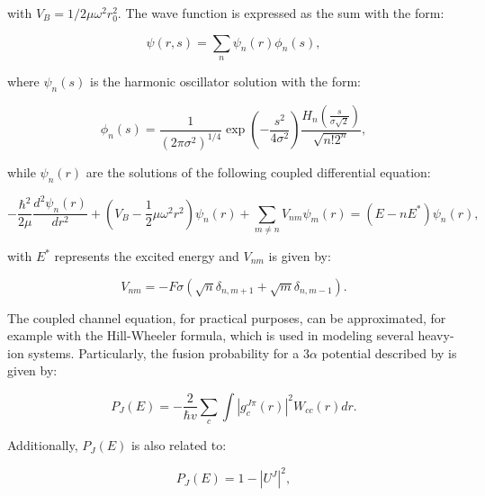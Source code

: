 \documentclass[openany]{book}
\begin{document}
with $V_B = 1/2\mu\omega^2r_0^2$. The wave function is expressed as the sum with the form: 

\begin{equation}\label{eq:potential_ZPM_waveFunction}
	\psi(r, s) = \sum_{n} {\psi_n(r)\phi_n(s)},
\end{equation}

where $\psi_n(s)$ is the harmonic oscillator solution with the form: 

\begin{equation}\label{eq:potential_ZPM_waveFunction_harmonicOscillator}
	\phi_n(s) = \frac{1}{(2\pi \sigma^2)^{1/4}} \exp {\left(-\frac{s^2}{4\sigma^2}\right)} \frac{H_n\left(\frac{s}{\sigma \sqrt 2 }\right)}{\sqrt{n!2^n}},
\end{equation}

while $\psi_n(r)$ are the solutions of the following coupled differential equation: 

\begin{equation}\label{eq:potential_ZPM_waveFunction_coupledDifferentialEquation}
	- \frac{\hbar^2}{2\mu} \frac{d^2\psi_n(r)}{dr^2} + \left(V_B - \frac{1}{2} \mu \omega^2 r^2 \right) \psi_n(r) + \sum_{m\neq n}{V_{nm}\psi_m(r)} = (E - nE^{*})\psi_n(r),
\end{equation}

with $E^{*}$ represents the excited energy and $V_{nm}$ is given by: 

\begin{equation}\label{eq:potential_ZPM_potentialCoupled}
	V_{nm} = - F\sigma (\sqrt {n} \delta_{n, m+1} + \sqrt{m}\delta_{n, m-1}). 
\end{equation}

The coupled channel equation, for practical purposes, can be approximated, for example with the Hill-Wheeler formula, which is used in modeling several heavy-ion systems. Particularly, the fusion probability for a  $3\alpha$ potential described by \cite{assuncao_descouvemont_2016} is given by:

\begin{equation}\label{eq:middleFusion_fusion_probability}
	P_J(E) = - \frac{2}{\hbar v} \sum_{c} \int {|g^{J\pi}_c(r)|^2 W_{cc}(r) dr}.
\end{equation}

Additionally, $P_J(E)$ is also related to:

\begin{equation}\label{eq:middleFusion_fusion_probability_approximation}
	P_J(E) = 1 - |U^{J}|^2,
\end{equation}
\end{document}
